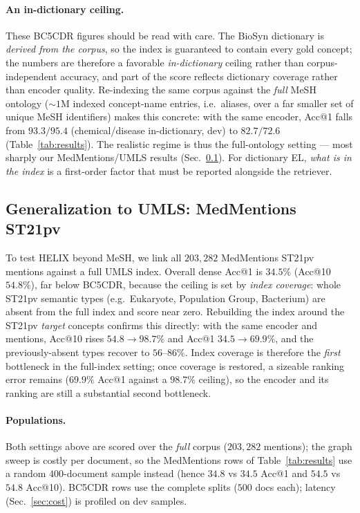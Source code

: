 \documentclass[runningheads]{llncs}
\begin{document}
\paragraph{An in-dictionary ceiling.}
These BC5CDR figures should be read with care. The BioSyn dictionary is
\emph{derived from the corpus}, so the index is guaranteed to contain every gold
concept; the numbers are therefore a favorable \emph{in-dictionary} ceiling rather
than corpus-independent accuracy, and part of the score reflects dictionary coverage
rather than encoder quality. Re-indexing the same corpus against the \emph{full}
MeSH ontology (${\sim}1$M indexed concept-name entries, i.e.\ aliases, over a far
smaller set of unique MeSH identifiers) makes this concrete: with the same encoder,
Acc@1 falls from $93.3/95.4$ (chemical/disease in-dictionary, dev) to $82.7/72.6$
(Table~\ref{tab:results}). The realistic regime is thus the full-ontology setting ---
most sharply our MedMentions/UMLS results (Sec.~\ref{sec:medmentions}). For
dictionary EL, \emph{what is in the index} is a first-order factor that must be
reported alongside the retriever.

\subsection{Generalization to UMLS: MedMentions ST21pv}
\label{sec:medmentions}
To test HELIX beyond MeSH, we link all $203{,}282$ MedMentions ST21pv mentions against
a full UMLS index. Overall dense Acc@1 is $34.5\%$ (Acc@10 $54.8\%$), far below
BC5CDR, because the ceiling is set by \emph{index coverage}: whole ST21pv semantic
types (e.g.\ Eukaryote, Population Group, Bacterium) are absent from the full index
and score near zero. Rebuilding the index around the ST21pv \emph{target} concepts
confirms this directly: with the same encoder and mentions,
Acc@10 rises $54.8\rightarrow98.7\%$ and Acc@1 $34.5\rightarrow69.9\%$, and the
previously-absent types recover to $56$--$86\%$. Index coverage is therefore the
\emph{first} bottleneck in the full-index setting; once coverage is restored, a
sizeable ranking error remains ($69.9\%$ Acc@1 against a $98.7\%$ ceiling), so the
encoder and its ranking are still a substantial second bottleneck.

\paragraph{Populations.} Both settings above are scored over the \emph{full} corpus
($203{,}282$ mentions); the graph sweep is costly per document, so the MedMentions
rows of Table~\ref{tab:results} use a random $400$-document sample instead (hence
$34.8$ vs $34.5$ Acc@1 and $54.5$ vs $54.8$ Acc@10). BC5CDR rows use the complete
splits ($500$ docs each); latency (Sec.~\ref{sec:cost}) is profiled on dev samples.
\end{document}
